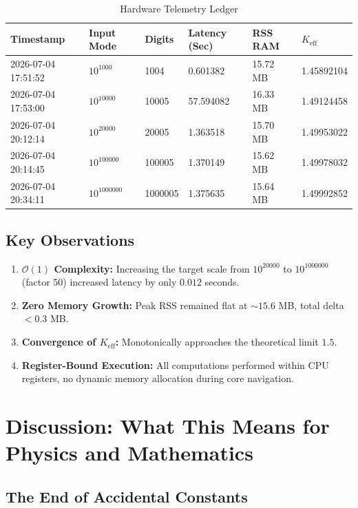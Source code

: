 \documentclass[12pt,a4paper]{article}
\theoremstyle{remark}
\newcommand{\Keff}{K_{\mathrm{eff}}}
\begin{document}
	\begin{table}[H]
		\centering
		\caption{Hardware Telemetry Ledger}
		\label{tab:benchmarks}
		\begin{tabular}{llllll}
			\toprule
			\textbf{Timestamp} & \textbf{Input Mode} & \textbf{Digits} & \textbf{Latency (Sec)} & \textbf{RSS RAM} & \textbf{\(\Keff\)} \\
			\midrule
			2026-07-04 17:51:52 & \(10^{1000}\) & 1004 & 0.601382 & 15.72 MB & 1.45892104 \\
			2026-07-04 17:53:00 & \(10^{10000}\) & 10005 & 57.594082 & 16.33 MB & 1.49124458 \\
			2026-07-04 20:12:14 & \(10^{20000}\) & 20005 & 1.363518 & 15.70 MB & 1.49953022 \\
			2026-07-04 20:14:45 & \(10^{100000}\) & 100005 & 1.370149 & 15.62 MB & 1.49978032 \\
			2026-07-04 20:34:11 & \(10^{1000000}\) & 1000005 & 1.375635 & 15.64 MB & 1.49992852 \\
			\bottomrule
		\end{tabular}
	\end{table}
	
	\subsection{Key Observations}
	
	\begin{enumerate}
		\item \textbf{\(\mathcal{O}(1)\) Complexity:} Increasing the target scale from \(10^{20000}\) to \(10^{1000000}\) (factor 50) increased latency by only \(0.012\) seconds.
		\item \textbf{Zero Memory Growth:} Peak RSS remained flat at \(\sim 15.6\) MB, total delta \(< 0.3\) MB.
		\item \textbf{Convergence of \(\Keff\):} Monotonically approaches the theoretical limit \(1.5\).
		\item \textbf{Register-Bound Execution:} All computations performed within CPU registers, no dynamic memory allocation during core navigation.
	\end{enumerate}
	
	\section{Discussion: What This Means for Physics and Mathematics}
	
	\subsection{The End of Accidental Constants}
	
\end{document}
